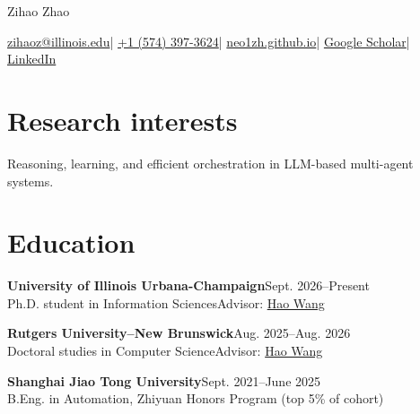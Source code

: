 \documentclass[11pt,letterpaper]{article}
\newcommand{\education}[4]{\needspace{3\baselineskip}\textbf{#1}\hfill {\small #2}\\#3{\small\color{secondary}\quad #4}\par\vspace{6pt}}
\begin{document}
{\fontsize{29}{33}\selectfont Zihao Zhao}\par
\vspace{5pt}
{\sffamily\small\href{mailto:zihaoz@illinois.edu}{zihaoz@illinois.edu}\enspace | \enspace\href{tel:+15743973624}{+1 (574) 397-3624}\enspace | \enspace\href{https://neo1zh.github.io}{neo1zh.github.io}\enspace | \enspace\href{https://scholar.google.com/citations?hl=en&user=lYnRuzkAAAAJ&view_op=list_works&sortby=pubdate}{Google Scholar}\enspace | \enspace\href{https://www.linkedin.com/in/zihao-neo-zhao/}{LinkedIn}}\par
\section{Research interests}
Reasoning, learning, and efficient orchestration in LLM-based multi-agent systems.
\section{Education}
\education{University of Illinois Urbana-Champaign}{Sept. 2026--Present}{Ph.D. student in Information Sciences}{Advisor: \href{http://www.wanghao.in}{Hao Wang}}
\education{Rutgers University--New Brunswick}{Aug. 2025--Aug. 2026}{Doctoral studies in Computer Science}{Advisor: \href{http://www.wanghao.in}{Hao Wang}}
\education{Shanghai Jiao Tong University}{Sept. 2021--June 2025}{B.Eng. in Automation, Zhiyuan Honors Program (top 5\% of cohort)}{}
\end{document}
